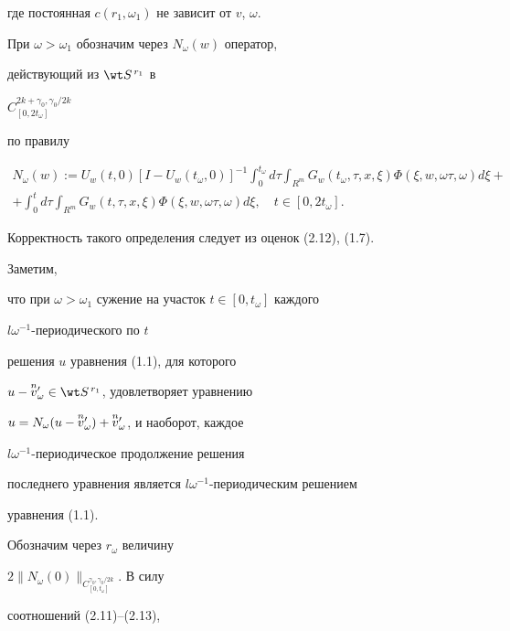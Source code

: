 \begin{pf}
\begin{equation}
\end{equation} 


где постоянная $c(r_1,\omega_1)$ не зависит от $v$, $\omega$. 


 


При $\omega>\omega_1$ обозначим через $N_\omega(w)$ оператор, 


действующий из $\wt S^{\,r_1}$ в 


$C^{2k+\gamma_0,\gamma_0/2k}_{[0,2t_\omega]}$ 


по правилу 


\begin{multline} 


N_\omega(w):=U_w(t,0)[I-U_w(t_\omega,0)]^{-1} 


\int^{t_\omega}_0d\tau\int_{R^m}G_w(t_\omega,\tau,x,\xi) 


\Phi(\xi,w,\omega\tau,\omega)d\xi+ \\ 


% 


+\int^t_0 d\tau\int_{R^m}G_w(t,\tau,x,\xi) 


\Phi(\xi,w,\omega\tau,\omega)d\xi,\quad t\in[0,2t_\omega]. 


\end{multline} 


Корректность такого определения следует из оценок (2.12), (1.7). 


Заметим, 


что при $\omega>\omega_1$ сужение на участок $t\in[0,t_\omega]$ каждого 


$l\omega^{-1}$-периодического по $t$ 


решения $u$ уравнения (1.1), для которого 


$u-\up{n}{v}'_\omega\in\wt S^{\,r_1}$, удовлетворяет уравнению 


$u=N_\omega(u-\overset{n}{v}{}'_\omega)+\overset{n}{v}{}'_\omega$, и наоборот, каждое 


$l\omega^{-1}$-периодическое продолжение решения 


последнего уравнения является $l\omega^{-1}$-периодическим решением 


уравнения (1.1). 


 


Обозначим через $r_\omega$ величину 


$2\|N_\omega(0)\|_{C^{\gamma_0,\gamma_0/2k}_{[0,t_\omega]}}$. В силу 


соотношений (2.11)--(2.13), 



\end{pf}
